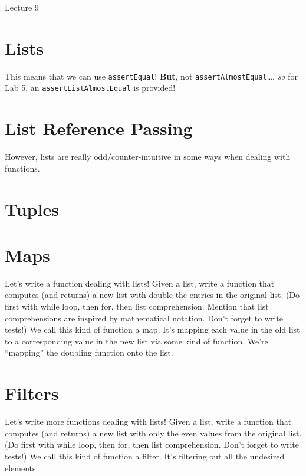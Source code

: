 \documentclass[12pt]{article}
\begin{document}
\begin{center}
   \LARGE Lecture 9
\end{center}

\section*{Lists}



\noindent
This means that we can use \lstinline{assertEqual}!  \textbf{But}, not
\lstinline{assertAlmostEqual}\dots, \emph{so} for Lab 5, an
\lstinline{assertListAlmostEqual} is provided!



\section{List Reference Passing}

However, lists are really odd/counter-intuitive in some ways when dealing with
functions.



\section*{Tuples}



\section{Maps}

Let's write a function dealing with lists!  Given a list, write a function that
computes (and returns) a new list with double the entries in the original list.
(Do first with while loop, then for, then list comprehension.  Mention that
list comprehensions are inspired by mathematical notation.  Don't forget to
write tests!)  We call this kind of function a map.  It's mapping each value in
the old list to a corresponding value in the new list via some kind of
function.  We're ``mapping'' the doubling function onto the list.

\section{Filters}

Let's write more functions dealing with lists!  Given a list, write a function
that computes (and returns) a new list with only the even values from the
original list.  (Do first with while loop, then for, then list comprehension.
Don't forget to write tests!)  We call this kind of function a filter.  It's
filtering out all the undesired elements.
\end{document}
